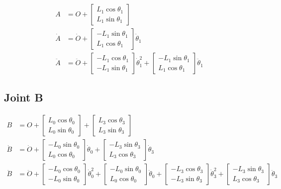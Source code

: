 \documentclass[letterpaper]{article}
\begin{document}
\begin{align}
	A &= O + \begin{bmatrix} L_1 \cos \theta_1 \\ L_1 \sin \theta_1 \end{bmatrix} \\
	\dot{A} &= \dot{O} + \begin{bmatrix} -L_1 \sin \theta_1 \\ L_1 \cos \theta_1 \end{bmatrix} \dot{\theta}_1 \\
	\ddot{A} &= \ddot{O} + \begin{bmatrix} -L_1 \cos \theta_1 \\ -L_1 \sin \theta_1 \end{bmatrix} \dot{\theta}_1^2 + \begin{bmatrix} -L_1 \sin \theta_1 \\ L_1 \cos \theta_1 \end{bmatrix} \ddot{\theta}_1
\end{align}

\subsection{Joint B}

\begin{align}
	B &= O + \begin{bmatrix} L_0 \cos \theta_0 \\ L_0 \sin \theta_0 \end{bmatrix} + \begin{bmatrix} L_3 \cos \theta_3 \\ L_3 \sin \theta_3 \end{bmatrix} \\
	\dot{B} &= \dot{O} + \begin{bmatrix} -L_0 \sin \theta_0 \\ L_0 \cos \theta_0 \end{bmatrix} \dot{\theta}_0 + \begin{bmatrix} -L_3 \sin \theta_3 \\ L_3 \cos \theta_3 \end{bmatrix} \dot{\theta}_3 \\
	\ddot{B} &= \ddot{O} +  \begin{bmatrix} -L_0 \cos \theta_0 \\ - L_0 \sin \theta_0 \end{bmatrix} \dot{\theta}_0^2 + \begin{bmatrix} -L_0 \sin \theta_0 \\ L_0 \cos \theta_0 \end{bmatrix} \ddot{\theta}_0 + \begin{bmatrix} -L_3 \cos \theta_3 \\ - L_3 \sin \theta_3 \end{bmatrix} \dot{\theta}_3^2 + \begin{bmatrix} -L_3 \sin \theta_3 \\ L_3 \cos \theta_3 \end{bmatrix} \ddot{\theta}_3 
\end{align}
\end{document}
